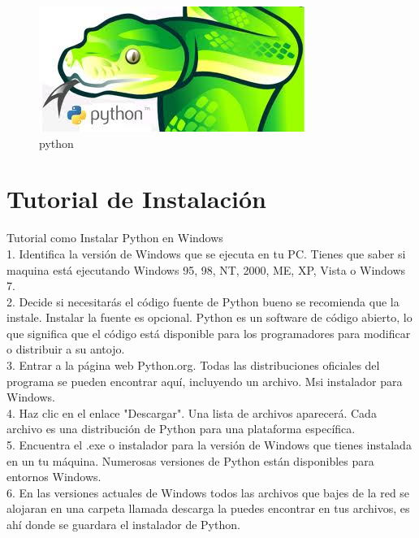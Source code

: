 \documentclass[11pt]{article} %
\begin{document}
\begin{figure}[htbp]
	\begin{center}
		\includegraphics[width=.50\textwidth]{./imagenes/python1.png}
		\caption{python}
		\label{python}
	\end{center}
\end{figure}

\section{Tutorial de Instalación}

Tutorial como Instalar Python en Windows\\
 

1.	Identifica la versión de Windows que se ejecuta en tu PC. Tienes que saber  si maquina está ejecutando Windows 95, 98, NT, 2000, ME, XP, Vista o Windows 7.\\

2.	Decide si necesitarás el código fuente de Python bueno se recomienda que la instale. Instalar la fuente es opcional. Python es un software de código abierto, lo que significa que el código está disponible para los programadores para modificar o distribuir a su antojo.\\

3.	Entrar a la página web Python.org. Todas las distribuciones oficiales del programa se pueden encontrar aquí, incluyendo un archivo. Msi instalador para Windows.\\

4.	Haz clic en el enlace "Descargar". Una lista de archivos aparecerá. Cada archivo es una distribución de Python para una plataforma específica.\\

5.	Encuentra el .exe o instalador para la versión de Windows que tienes instalada en un tu máquina.  Numerosas versiones de Python están disponibles para entornos Windows.\\


6.	En las versiones actuales de Windows todos las archivos que bajes de la red se alojaran en una carpeta llamada descarga la puedes encontrar en tus archivos, es ahí donde se guardara el instalador de Python.\\  
\end{document}
